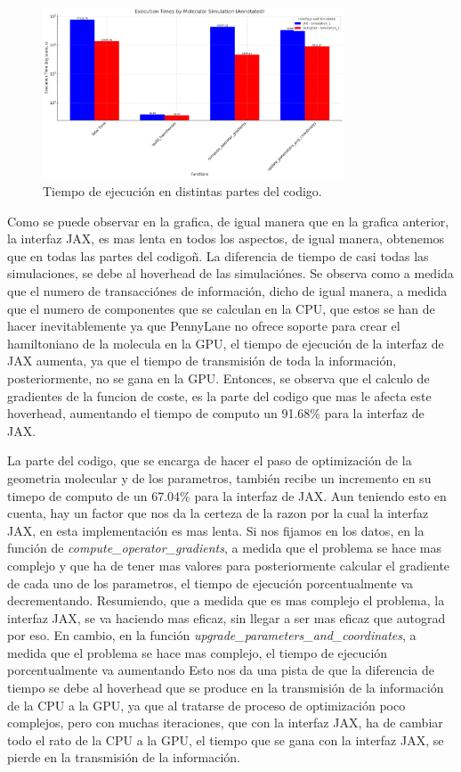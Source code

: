 \begin{figure}[H]
  \centering
  \includegraphics[width=0.8\textwidth]{img/time_functions.png}
  \caption{Tiempo de ejecución en distintas partes del codigo.}
  \label{fig:time_functions}
\end{figure}

Como se puede observar en la grafica, de igual manera que en la grafica anterior, la interfaz JAX, es mas lenta en todos los aspectos, de igual manera, obtenemos que en todas las partes del codigoñ. La diferencia de tiempo de casi todas las simulaciones, se debe al hoverhead de las simulaciónes. Se observa como a medida que el numero de transacciónes de información, dicho de igual manera, a medida que el numero de componentes que se calculan en la CPU, que estos se han de hacer inevitablemente ya que PennyLane no ofrece soporte para crear el hamiltoniano de la molecula en la GPU, el tiempo de ejecución de la interfaz de JAX aumenta, ya que el tiempo de transmisión de toda la información, posteriormente, no se gana en la GPU. Entonces, se observa que el calculo de gradientes de la funcion de coste, es la parte del codigo que mas le afecta este hoverhead, aumentando el tiempo de computo un 91.68\% para la interfaz de JAX.

La parte del codigo, que se encarga de hacer el paso de optimización de la geometria molecular y de los parametros, también recibe un incremento en su timepo de computo de un 67.04\% para la interfaz de JAX. Aun teniendo esto en cuenta, hay un factor que nos da la certeza de la razon por la cual la interfaz JAX, en esta implementación es mas lenta. Si nos fijamos en los datos, en la función de \textit{compute\_operator\_gradients}, a medida que el problema se hace mas complejo y que ha de tener mas valores para posteriormente calcular el gradiente de cada uno de los parametros, el tiempo de ejecución porcentualmente va decrementando. Resumiendo, que a medida que es mas complejo el problema, la interfaz JAX, se va haciendo mas eficaz, sin llegar a ser mas eficaz que autograd por eso. En cambio, en la función \textit{upgrade\_parameters\_and\_coordinates}, a medida que el problema se hace mas complejo, el tiempo de ejecución porcentualmente va aumentando Esto nos da una pista de que la diferencia de tiempo se debe al hoverhead que se produce en la transmisión de la información de la CPU a la GPU, ya que al tratarse de proceso de optimización poco complejos, pero con muchas iteraciones, que con la interfaz JAX, ha de cambiar todo el rato de la CPU a la GPU, el tiempo que se gana con la interfaz JAX, se pierde en la transmisión de la información.

